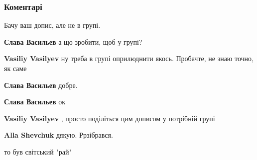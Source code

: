  
 
 
 
 
\subsubsection{Коментарі}

\begin{itemize} %
Бачу ваш допис, але не в групі.

\begin{itemize} %
\textbf{Слава Васильев} а що зробити, щоб у групі?

\textbf{Vasiliy Vasilyev} ну треба в групі оприлюднити якось.
Пробачте, не знаю точно, як саме

\textbf{Слава Васильев} добре.

\textbf{Слава Васильев} ок

\textbf{Vasiliy Vasilyev} , просто поділіться цим дописом у потрібній групі

\textbf{Alla Shevchuk} дякую. Ррзібрався.
\end{itemize} %

то був світський "рай"

\end{itemize} %
